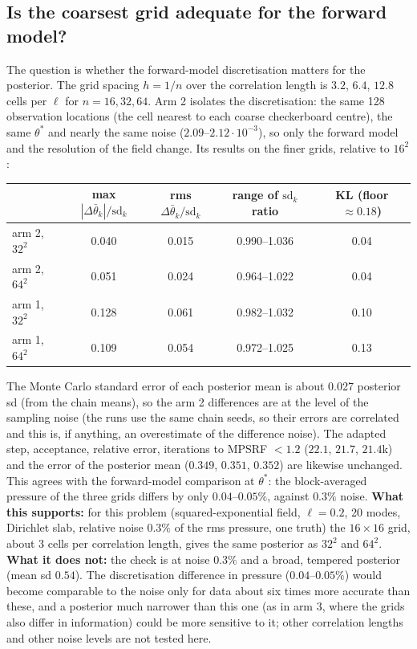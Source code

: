\documentclass[11pt]{article}
\begin{document}
\subsection{Is the coarsest grid adequate for the forward model?}\label{sec:adequacy}
The question is whether the forward-model discretisation matters for the posterior. The grid spacing $h=1/n$ over the correlation length is $3.2$, $6.4$, $12.8$ cells per $\ell$ for $n=16,32,64$. Arm 2 isolates the discretisation: the same 128 observation locations (the cell nearest to each coarse checkerboard centre), the same $\theta^*$ and nearly the same noise ($2.09$--$2.12\cdot10^{-3}$), so only the forward model and the resolution of the field change. Its results on the finer grids, relative to $16^2$:
\begin{center}\small
\begin{tabular}{@{}lcccc@{}}\toprule
 & max $|\Delta\bar\theta_k|/\mathrm{sd}_k$ & rms $\Delta\bar\theta_k/\mathrm{sd}_k$ & range of $\mathrm{sd}_k$ ratio & KL (floor $\approx0.18$)\\ \midrule
arm 2, $32^2$ & 0.040 & 0.015 & 0.990--1.036 & 0.04\\
arm 2, $64^2$ & 0.051 & 0.024 & 0.964--1.022 & 0.04\\
arm 1, $32^2$ & 0.128 & 0.061 & 0.982--1.032 & 0.10\\
arm 1, $64^2$ & 0.109 & 0.054 & 0.972--1.025 & 0.13\\ \bottomrule
\end{tabular}
\end{center}
The Monte Carlo standard error of each posterior mean is about 0.027 posterior sd (from the chain means), so the arm 2 differences are at the level of the sampling noise (the runs use the same chain seeds, so their errors are correlated and this is, if anything, an overestimate of the difference noise). The adapted step, acceptance, relative error, iterations to MPSRF $<1.2$ ($22.1$, $21.7$, $21.4$k) and the error of the posterior mean ($0.349$, $0.351$, $0.352$) are likewise unchanged. This agrees with the forward-model comparison at $\theta^*$: the block-averaged pressure of the three grids differs by only $0.04$--$0.05\%$, against $0.3\%$ noise. \textbf{What this supports:} for this problem (squared-exponential field, $\ell=0.2$, 20 modes, Dirichlet slab, relative noise $0.3\%$ of the rms pressure, one truth) the $16\times16$ grid, about 3 cells per correlation length, gives the same posterior as $32^2$ and $64^2$. \textbf{What it does not:} the check is at noise $0.3\%$ and a broad, tempered posterior (mean sd $0.54$). The discretisation difference in pressure ($0.04$--$0.05\%$) would become comparable to the noise only for data about six times more accurate than these, and a posterior much narrower than this one (as in arm 3, where the grids also differ in information) could be more sensitive to it; other correlation lengths and other noise levels are not tested here.
\end{document}
